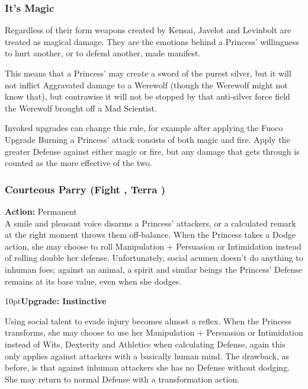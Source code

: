 \begin{mybox}
 
 \subsubsection*{It's Magic} 
 
 Regardless of their form weapons created by Kensai, Javelot and Levinbolt are treated as magical damage. They are the emotions behind a Princess' willingness to hurt another, or to defend another, made manifest. 
  
 This means that a Princess' may create a sword of the purest silver, but it will not inflict Aggravated damage to a Werewolf (though the Werewolf might not know that), but contrawise it will not be stopped by that anti-silver force field the Werewolf brought off a Mad Scientist. 
 
 Invoked upgrades can change this rule, for example after applying the Fuoco Upgrade Burning a Princess' attack consists of both magic and fire. Apply the greater Defense against either magic or fire, but any damage that gets through is counted as the more effective of the two. 
\end{mybox}

\subsubsection*{Courteous Parry (Fight \textbullet, Terra \textbullet)}

\noindent \textbf{Action:} Permanent\\

\noindent A smile and pleasant voice disarms a Princess' attackers, or a calculated remark at the right moment throws them off-balance. When the Princess takes a Dodge action, she may choose to roll Manipulation + Persuasion or Intimidation instead of rolling double her defense. Unfortunately, social acumen doesn't do anything to inhuman foes; against an animal, a spirit and similar beings the Princess' Defense remains at its base value, even when she dodges.

\begin{myindentpar}{10pt}\textbf{Upgrade: Instinctive}

Using social talent to evade injury becomes almost a reflex. When the Princess transforms, she may choose to use her Manipulation + Persuasion or Intimidation instead of Wits, Dexterity and Athletics when calculating Defense, again this only applies against attackers with a basically human mind. The drawback, as before, is that against inhuman attackers she has no Defense without dodging. She may return to normal Defense with a transformation action.\end{myindentpar}

